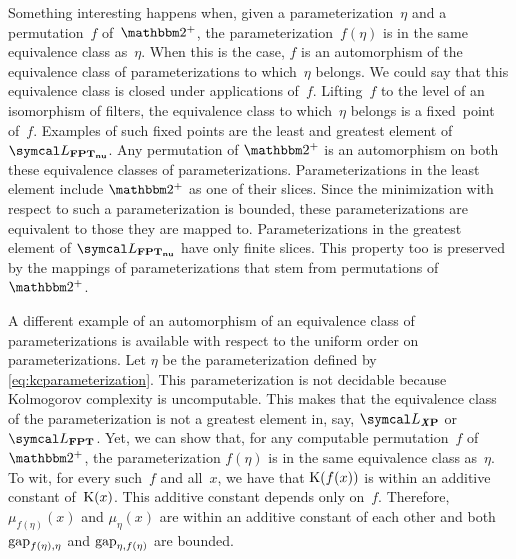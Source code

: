 Something interesting happens when, given a parameterization~$\eta$ and a permutation~$f$ of~$\binary^+$, the parameterization~$f(\eta)$ is in the same equivalence class as~$\eta$.
When this is the case, $f$ is an automorphism of the equivalence class of parameterizations to which~$\eta$ belongs.
We could say that this equivalence class is closed under applications of~$f$.
Lifting~$f$ to the level of an isomorphism of filters, the equivalence class to which~$\eta$ belongs is a fixed~point of~$f$.
Examples of such fixed points are the least and greatest element of $\calL_\clnu{FPT}$.
Any permutation of $\binary^+$ is an automorphism on both these equivalence classes of parameterizations.
Parameterizations in the least element include $\binary^+$ as one of their slices.
Since the minimization with respect to such a parameterization is bounded, these parameterizations are equivalent to those they are mapped to.
Parameterizations in the greatest element of $\calL_\clnu{FPT}$ have only finite slices.
This property too is preserved by the mappings of parameterizations that stem from permutations of $\binary^+$.
\begin{example}
  A different example of an automorphism of an equivalence class of parameterizations is available with respect to the uniform order on parameterizations.
  Let $\eta$ be the parameterization defined by \eqref{eq:kcparameterization}.
  This parameterization is not decidable because Kolmogorov complexity is uncomputable.
  This makes that the equivalence class of the parameterization is not a greatest element in, say, $\calL_\clX{P}$ or $\calL_\cl{FPT}$.
  Yet, we can show that, for any computable permutation~$f$ of~$\binary^+$, the parameterization $f(\eta)$ is in the same equivalence class as~$\eta$.
  To wit, for every such~$f$ and all~$x$, we have that $\operatorname{K}(f(x))$ is within an additive constant of~$\operatorname{K}(x)$.
  This additive constant depends only on~$f$.
  Therefore, $\mu_{f(\eta)}(x)$ and $\mu_\eta(x)$ are within an additive constant of each other and both $\operatorname{gap}_{f(\eta), \eta}$ and $\operatorname{gap}_{\eta, f(\eta)}$ are bounded.
\end{example}

